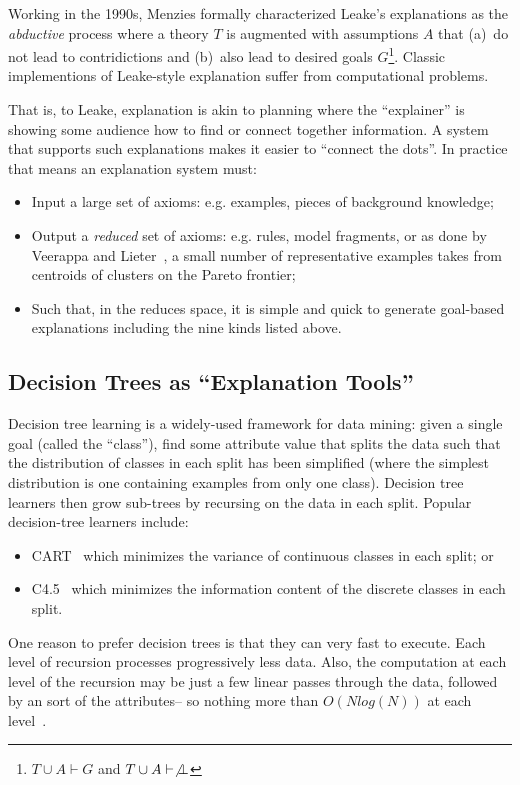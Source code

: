 \documentclass[runningheads]{llncs}
\newcommand{\bi}{\begin{itemize}}
\newcommand{\ei}{\end{itemize}}
\begin{document}
Working in the 1990s, Menzies formally characterized Leake's explanations as
the  {\em abductive} process where a theory $T$
is augmented with assumptions $A$ that (a)~do not lead to contridictions and
(b)~also lead to desired goals $G$\footnote{$T\cup A\vdash G$ and $T\cup A\vdash\not\bot$}.
Classic implementions of Leake-style explanation suffer from computational problems.



That is, to Leake, explanation is akin to planning
where the ``explainer'' is showing some audience how to 
find or connect together information.
A system that supports such explanations makes it easier
to ``connect the dots''. In practice that means an explanation system
must:
\bi
\item Input a large set of axioms: e.g. examples, pieces of background knowledge;
\item Output a {\em reduced} set of axioms:
e.g. rules, model fragments,
or as done by Veerappa and Lieter~\cite{veerappa11}, a small number
of representative examples takes from centroids of clusters on the Pareto
frontier;
\item Such that, in the reduces space, it is simple and quick to generate
goal-based explanations including the nine kinds listed above.
\ei
\subsection{Decision Trees as ``Explanation Tools''}
Decision tree learning is a widely-used framework for data mining: given a single goal
(called the ``class''), find some attribute value that splits the data such
that the distribution of classes in each split has been simplified
(where the simplest distribution is one containing examples from only one class).
Decision tree learners then grow sub-trees by recursing on the data in  each split. 
Popular decision-tree learners include:
\bi
\item CART~\cite{breiman84,} which  minimizes the variance of continuous classes in each split; or
\item C4.5~\cite{quinlan92} which minimizes the information content of the discrete classes in each split.
\ei
One reason to prefer decision trees is that they can very fast to
execute. Each level of recursion
processes progressively less data. Also, the computation at each level of the recursion
may be just a few linear passes through the data, followed by an
sort of the attributes-- so nothing more than $O(Nlog(N))$ at each level~\cite{witten11}.
\end{document}
